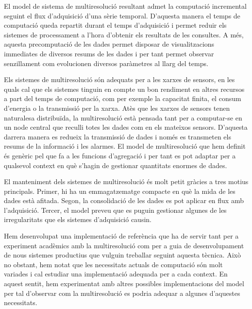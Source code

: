 \documentclass{scrartcl}
\begin{document}
El model de sistema de multiresolució resultant admet la computació
incremental seguint el flux d'adquisició d'una sèrie
temporal. D'aquesta manera el temps de computació queda repartit
durant el temps d'adquisició i permet reduir els sistemes de
processament a l'hora d'obtenir els resultats de les consultes.  A
més, aquesta precomputació de les dades permet disposar de
visualitzacions immediates de diversos resums de les dades i per tant
permet observar senzillament  com evolucionen
diversos paràmetres al llarg del temps.

Els sistemes de multiresolució són adequats per a les xarxes de
sensors, en les quals cal que els sistemes tinguin en compte un bon
rendiment en altres recursos a part del temps de computació, com per
exemple la capacitat finita, el consum d'energia o la transmissió per
la xarxa.  Atès que les xarxes de sensors tenen naturalesa
distribuïda, la multiresolució està pensada tant per a computar-se en
un node central que reculli totes les dades com en els mateixos
sensors. D'aquesta darrera manera es redueix la transmissió de dades i
només es transmeten els resums de la informació i les alarmes.  El
model de multiresolució que hem definit és genèric pel que fa a les
funcions d'agregació i per tant es pot adaptar per a qualsevol context
en què s'hagin de gestionar quantitats enormes de dades.


El manteniment dels sistemes de multiresolució és molt petit gràcies a
tres motius principals. Primer, hi ha un emmagatzematge
compacte en què la mida de les dades està afitada. Segon, la
consolidació de les dades es pot aplicar en flux amb
l'adquisició. Tercer, el model preveu que es puguin gestionar algunes
de les irregularitats que els sistemes d'adquisició causin.

Hem desenvolupat una implementació de referència que ha de servir tant
per a experiment acadèmics amb la multiresolució com per a guia de
desenvolupament de nous sistemes productius que vulguin treballar
seguint aquesta tècnica.  Això no obstant, hem notat que les
necessitats actuals de computació són molt variades i cal estudiar una
implementació adequada per a cada context. En aquest sentit, hem
experimentat amb altres possibles implementacions del model per tal
d'observar com la multiresolució es podria adequar a algunes
d'aquestes necessitats.
\end{document}
